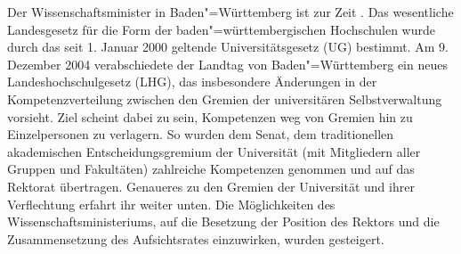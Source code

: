Der Wissenschaftsminister in Baden"=Württemberg ist zur Zeit \wissenschaftsministerbawue .
Das wesentliche Landesgesetz für die Form der
baden"=württembergischen Hochschulen wurde durch das seit 1. Januar 2000
geltende Universitätsgesetz (UG) bestimmt. Am 9. Dezember 2004
verabschiedete der Landtag von Baden"=Württemberg ein neues
Landeshochschulgesetz (LHG), das insbesondere Änderungen in der
Kompetenzverteilung zwischen den Gremien der universitären
Selbstverwaltung vorsieht. Ziel scheint dabei zu sein, Kompetenzen weg von
Gremien hin zu Einzelpersonen zu verlagern. So wurden dem Senat, dem
traditionellen akademischen Entscheidungsgremium der Universität (mit
Mitgliedern aller Gruppen und Fakultäten) zahlreiche Kompetenzen genommen
und auf das Rektorat übertragen. Genaueres zu den Gremien der Universität
und ihrer Verflechtung erfahrt ihr weiter unten. Die Möglichkeiten des
Wissenschaftsministeriums, auf die Besetzung der Position des Rektors und
die Zusammensetzung des Aufsichtsrates einzuwirken, wurden gesteigert.

